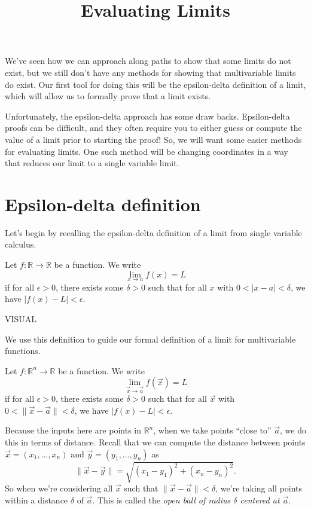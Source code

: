 \documentclass{ximera}
\title{Evaluating Limits}
\begin{document}
\begin{abstract}
\end{abstract}
\maketitle

We've seen how we can approach along paths to show that some limits do not exist, but we still don't have any methods for showing that multivariable limits do exist. Our first tool for doing this will be the epsilon-delta definition of a limit, which will allow us to formally prove that a limit exists.

Unfortunately, the epsilon-delta approach has some draw backs. Epsilon-delta proofs can be difficult, and they often require you to either guess or compute the value of a limit prior to starting the proof! So, we will want some easier methods for evaluating limits. One such method will be changing coordinates in a way that reduces our limit to a single variable limit.

\section*{Epsilon-delta definition}

Let's begin by recalling the epsilon-delta definition of a limit from single variable calculus.

\begin{definition}
Let $f:\mathbb{R}\rightarrow\mathbb{R}$ be a function. We write
\[
\lim_{x\rightarrow a} f(x) = L
\]
if for all $\epsilon >0$, there exists some $\delta >0$ such that for all $x$ with $0 < |x-a| < \delta$, we have $|f(x)-L| < \epsilon$.
\end{definition}

VISUAL

We use this definition to guide our formal definition of a limit for multivariable functions.

\begin{definition}
Let $f:\mathbb{R}^n\rightarrow\mathbb{R}$ be a function. We write
\[
\lim_{\vec{x}\rightarrow \vec{a}} f(\vec{x}) = L
\]
if for all $\epsilon >0$, there exists some $\delta >0$ such that for all $\vec{x}$ with $0 < \|\vec{x}-\vec{a}\| < \delta$, we have $|f(x)-L| < \epsilon$.
\end{definition}

Because the inputs here are points in $\mathbb{R}^n$, when we take points ``close to'' $\vec{a}$, we do this in terms of distance. Recall that we can compute the distance between points $\vec{x}=(x_1,...,x_n)$ and $\vec{y}=(y_1,...,y_n)$ as
\[
\|\vec{x}-\vec{y}\| = \sqrt{(x_1-y_1)^2+(x_n-y_n)^2}.
\]
So when we're considering all $\vec{x}$ such that $\|\vec{x}-\vec{a}\| < \delta$, we're taking all points within a distance $\delta$ of $\vec{a}$. This is called the \emph{open ball of radius $\delta$ centered at $\vec{a}$}. 
\end{document}

